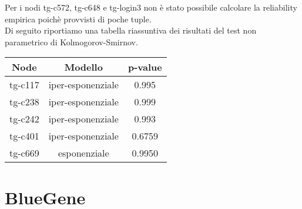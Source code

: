 \noindent
Per i nodi tg-c572, tg-c648 e tg-login3 non è stato possibile calcolare la reliability empirica poichè provvisti di poche tuple.\\
Di seguito riportiamo una tabella riassuntiva dei risultati del test non parametrico di Kolmogorov-Smirnov.
 \begin{table}[htbp]
    \centering
    \label{tab:esempio}
    \begin{tabular}{|c|c|c|} %
        \hline
        Node & Modello &p-value \\ %
        \hline
        tg-c117 & iper-esponenziale & 0.995 \\
        tg-c238 & iper-esponenziale & 0.999 \\
        tg-c242 & iper-esponenziale & 0.993 \\
        tg-c401 & iper-esponenziale & 0.6759 \\
        tg-c669 & esponenziale & 0.9950 \\
        \hline
    \end{tabular}
\end{table}
\noindent

\section{BlueGene}
